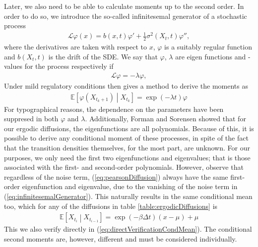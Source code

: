 Later, we also need to be able to calculate moments up to the second order. In order to do so, we introduce the so-called infinitesemal generator of a stochastic process
\begin{align}
    \mathcal{L}\varphi(x) = b(x, t) \varphi' + \frac{1}{2}\sigma^2(X_t, t)\varphi'', \label{eq:infinitesemalGenerator}
\end{align}
where the derivatives are taken with respect to $x$, $\varphi$ is a suitably regular function and $b(X_t, t)$ is the drift of the SDE. We say that $\varphi$, $\lambda$ are eigen functions and -values for the process respectively if
\begin{align}
    \mathcal{L}\varphi = - \lambda \varphi,
\end{align}
Under mild regulatory conditions \cite[theorem 1.16]{StatisticalMethodsForSDE} then gives a method to derive the moments as
\begin{align}
    \mathbb{E}\left[\varphi(X_{t_k + 1}) \middle | X_{t_k}\right] = \exp\left(-\lambda t\right)\varphi \label{eq:momentConditions}
\end{align}
For typographical reasons, the dependence on the parameters have been suppresed in both $\varphi$ and $\lambda$. Additionally, Forman and Sorensen \cite{FormanSorensen2008} showed that for our ergodic diffusions, the eigenfunctions are all polynomials. Because of this, it is possible to derive any conditional moment of these processes, in spite of the fact that the transition densities themselves, for the most part, are unknown. For our purposes, we only need the first two eigenfunctions and eigenvalues; that is those associated with the first- and second-order polynomials. However, observe that regardless of the noise term, (\ref{eq:pearsonDiffusion}) always have the same first-order eigenfunction and eigenvalue,  due to the vanishing of the noise term in (\ref{eq:infinitesemalGenerator}). This naturally results in the same conditional mean too, which for any of the diffusions in table \ref{table:ergodicDiffusions} is
\begin{align}
    \mathbb{E}\left[X_{t_{i}} \middle|X_{t_{i - 1}} \right] = \exp\left(-\beta\Delta t\right)\left(x-\mu\right) + \mu
\end{align}
This we also verify directly in (\ref{eq:directVerificationCondMean}). The conditional second moments are, however, different and must be considered individually. 
